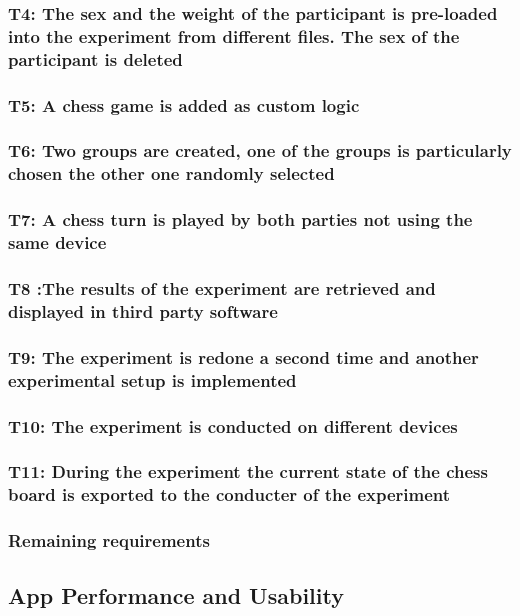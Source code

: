 \subsubsection*{T4: The sex and the weight of the participant is pre-loaded into the experiment from different files. The sex of the participant is deleted}

\subsubsection*{T5: A chess game is added as custom logic}

\subsubsection*{T6: Two groups are created, one of the groups is particularly chosen the other one randomly selected}

\subsubsection*{T7: A chess turn is played by both parties not using the same device}

\subsubsection*{T8 :The results of the experiment are retrieved and displayed in third party software}

\subsubsection*{T9: The experiment is redone a second time and another experimental setup is implemented}

\subsubsection*{T10: The experiment is conducted on different devices}

\subsubsection*{T11: During the experiment the current state of the chess board is exported to the conducter of the experiment}

\subsubsection*{Remaining requirements}






\subsection{App Performance and Usability}
